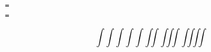 \documentclass{article}
\begin{document}
\texttt{\string\intop\ =\ \meaning\intop\\\string\int\ =\ \meaning\int}

\[ \displaystyle \intop \int \intop\nolimits \intop\limits \intop\displaylimits \ConTeXtInt \iint \iiint \iiiint \]

\fontname{}
\end{document}
